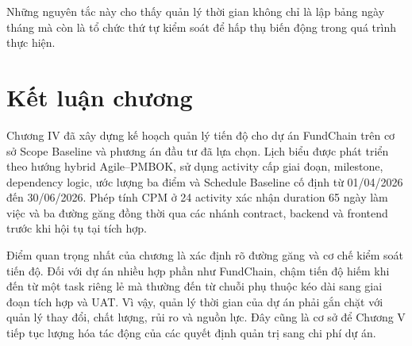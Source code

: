 Những nguyên tắc này cho thấy quản lý thời gian không chỉ là lập bảng ngày tháng mà còn là tổ chức thứ tự kiểm soát để hấp thụ biến động trong quá trình thực hiện.

\fi
\section{Kết luận chương}

Chương IV đã xây dựng kế hoạch quản lý tiến độ cho dự án FundChain trên cơ sở Scope Baseline và phương án đầu tư đã lựa chọn. Lịch biểu được phát triển theo hướng hybrid Agile--PMBOK, sử dụng activity cấp giai đoạn, milestone, dependency logic, ước lượng ba điểm và Schedule Baseline cố định từ 01/04/2026 đến 30/06/2026. Phép tính CPM ở 24 activity xác nhận duration 65 ngày làm việc và ba đường găng đồng thời qua các nhánh contract, backend và frontend trước khi hội tụ tại tích hợp.

Điểm quan trọng nhất của chương là xác định rõ đường găng và cơ chế kiểm soát tiến độ. Đối với dự án nhiều hợp phần như FundChain, chậm tiến độ hiếm khi đến từ một task riêng lẻ mà thường đến từ chuỗi phụ thuộc kéo dài sang giai đoạn tích hợp và UAT. Vì vậy, quản lý thời gian của dự án phải gắn chặt với quản lý thay đổi, chất lượng, rủi ro và nguồn lực. Đây cũng là cơ sở để Chương V tiếp tục lượng hóa tác động của các quyết định quản trị sang chi phí dự án.
